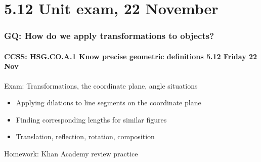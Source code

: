 \documentclass{beamer}
\begin{document}
\section{5.12 Unit exam, 22 November}
\frame
{
  \frametitle{GQ: How do we apply transformations to objects?}
  \framesubtitle{CCSS: HSG.CO.A.1 Know precise geometric definitions \hfill \alert{5.12 Friday 22 Nov}}

  \begin{block}{Exam: Transformations, the coordinate plane, angle situations}
  \begin{itemize}
    \item Applying dilations to line segments on the coordinate plane
    \item Finding corresponding lengths for similar figures
    \item Translation, reflection, rotation, composition
  \end{itemize}
  \end{block}
  Homework: Khan Academy review practice
}
\end{document}
